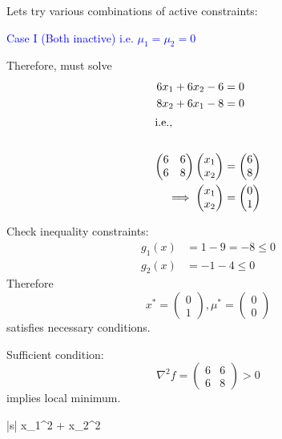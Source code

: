 \documentclass{article}
\begin{document}
	Lets try various combinations of active constraints:
	
			\textcolor{blue}{Case I  (Both inactive) 
			i.e. $\mu_1 = \mu_2 = 0$}
			
			Therefore, must solve
			\begin{align*}
			  6x_1 + 6x_2 - 6 &= 0\\
			  8x_2 + 6x_1 - 8 &= 0\\
			\intertext{i.e.,}\\
			\begin{pmatrix}
			    6 & 6\\
			    6 & 8
			  \end{pmatrix}\begin{pmatrix}
			    x_1\\x_2
			  \end{pmatrix}&=\begin{pmatrix}
			    6\\8
			  \end{pmatrix}\\
			\implies 
			\begin{pmatrix}
			    x_1\\x_2
			  \end{pmatrix}&=\begin{pmatrix}
			    0\\1
			  \end{pmatrix}
			\end{align*}	

			Check inequality constraints:
			\begin{align*}
				g_1(x) &= 1 - 9 = -8 \leq 0 \\
				g_2(x) &= -1 - 4 \leq 0
			\end{align*}
			Therefore
			\[
				x^{\ast} = \begin{pmatrix}
			    			0\\1
			  			   \end{pmatrix}, 
			  	\mu^{\ast} = \begin{pmatrix}
			    				0\\0
			  			     \end{pmatrix}
			\]
			satisfies necessary conditions.
			
			Sufficient condition:
			\[ 
				\nabla^2 f 
					= \begin{pmatrix}
			    		6 & 6\\
			    		6 & 8
			  		  \end{pmatrix} > 0  
			\]	
			implies local minimum.		

\par{}
	\begin{mini*}|s|
		{}{x_1^2 + x_2^2}{}{}
	\end{mini*}
\end{document}
